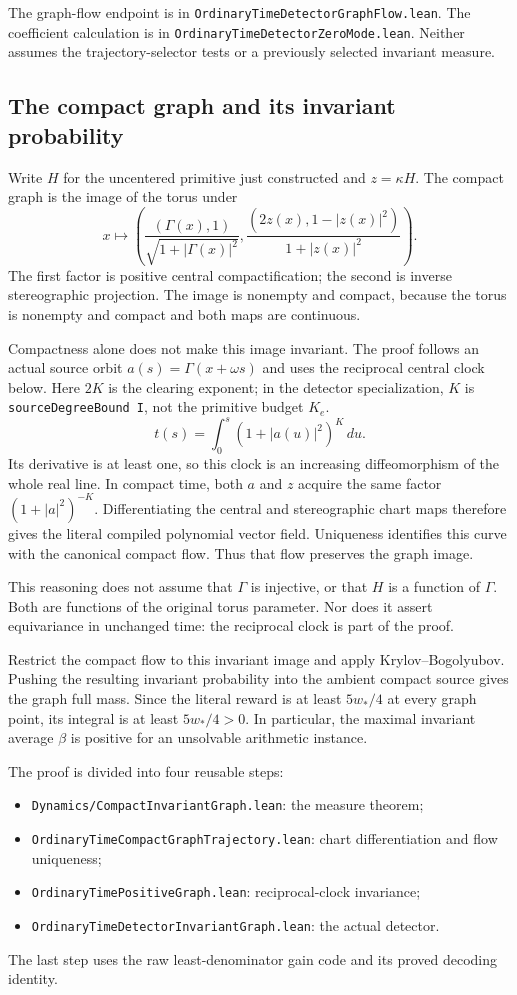 \documentclass[11pt]{article}
\newcommand{\code}[1]{{\small\nolinkurl{#1}}}
\begin{document}
The graph-flow endpoint is in \code{OrdinaryTimeDetectorGraphFlow.lean}.
The coefficient calculation is in \code{OrdinaryTimeDetectorZeroMode.lean}.
Neither assumes the trajectory-selector tests or a previously selected
invariant measure.

\subsection{The compact graph and its invariant probability}

Write $H$ for the uncentered primitive just constructed and
$z=\kappa H$. The compact graph is the image of the torus under
\[
 x\longmapsto
 \left(\frac{(\Gamma(x),1)}{\sqrt{1+|\Gamma(x)|^2}},
       \frac{(2z(x),1-|z(x)|^2)}{1+|z(x)|^2}\right).
\]
The first factor is positive central compactification; the second is
inverse stereographic projection. The image is nonempty and compact,
because the torus is nonempty and compact and both maps are continuous.

Compactness alone does not make this image invariant. The proof follows
an actual source orbit $a(s)=\Gamma(x+\omega s)$ and uses the reciprocal
central clock below. Here $2K$ is the clearing exponent; in the detector
specialization, $K$ is \code{sourceDegreeBound I}, not the primitive
budget $K_e$.
\[
 t(s)=\int_0^s (1+|a(u)|^2)^K\,du.
\]
Its derivative is at least one, so this clock is an increasing
diffeomorphism of the whole real line. In compact time, both $a$ and
$z$ acquire the same factor $(1+|a|^2)^{-K}$. Differentiating the central
and stereographic chart maps therefore gives the literal compiled
polynomial vector field. Uniqueness identifies this curve with the
canonical compact flow. Thus that flow preserves the graph image.

This reasoning does not assume that $\Gamma$ is injective, or that $H$
is a function of $\Gamma$. Both are functions of the original torus
parameter. Nor does it assert equivariance in unchanged time: the
reciprocal clock is part of the proof.

Restrict the compact flow to this invariant image and apply
Krylov--Bogolyubov. Pushing the resulting invariant probability into
the ambient compact source gives the graph full mass. Since the literal
reward is at least $5w_*/4$ at every graph point, its integral is at least
$5w_*/4>0$. In particular, the maximal invariant average $\beta$ is
positive for an unsolvable arithmetic instance.

The proof is divided into four reusable steps:
\begin{itemize}
\item \code{Dynamics/CompactInvariantGraph.lean}: the measure theorem;
\item \code{OrdinaryTimeCompactGraphTrajectory.lean}: chart differentiation
and flow uniqueness;
\item \code{OrdinaryTimePositiveGraph.lean}: reciprocal-clock invariance;
\item \code{OrdinaryTimeDetectorInvariantGraph.lean}: the actual detector.
\end{itemize}
The last step uses the raw least-denominator gain code and its proved
decoding identity.
\end{document}
